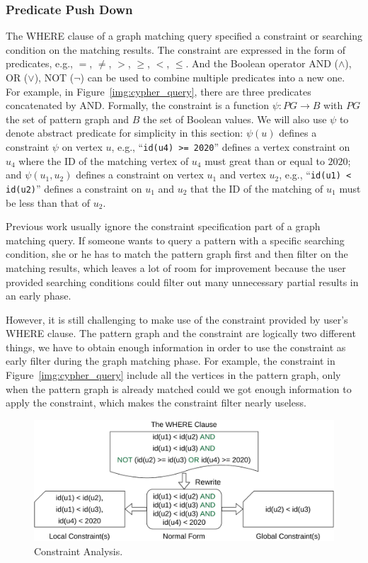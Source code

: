 \subsubsection{Predicate Push Down}
The WHERE clause of a graph matching query specified a constraint or searching condition on the matching results.
The constraint are expressed in the form of predicates, e.g., $=$, $\neq$, $>$, $\ge$, $<$, $\le$.
And the Boolean operator AND ($\land$), OR ($\lor$), NOT ($\lnot$) can be used to combine multiple predicates into a new one.
For example, in Figure~\ref{img:cypher_query}, there are three predicates concatenated by AND\@.
Formally, the constraint is a function $\psi: PG \rightarrow B$ with $PG$ the set of pattern graph and $B$ the set of Boolean values.
We will also use $\psi$ to denote abstract predicate for simplicity in this section:
$\psi(u)$ defines a constraint $\psi$ on vertex $u$, e.g., ``\texttt{id(u4) >= 2020}'' defines a vertex constraint on $u_4$ where the ID of the matching vertex of $u_4$ must great than or equal to $2020$;
and $\psi(u_1, u_2)$ defines a constraint on vertex $u_1$ and vertex $u_2$,
e.g., ``\texttt{id(u1) < id(u2)}'' defines a constraint on $u_1$ and $u_2$ that the ID of the matching of $u_1$ must be less than that of $u_2$.

Previous work usually ignore the constraint specification part of a graph matching query.
If someone wants to query a pattern with a specific searching condition,
she or he has to match the pattern graph first and then filter on the matching results,
which leaves a lot of room for improvement because the user provided searching conditions could filter out many unnecessary
partial results in an early phase.

However, it is still challenging to make use of the constraint provided by user's WHERE clause.
The pattern graph and the constraint are logically two different things,
we have to obtain enough information in order to use the constraint as early filter during the graph matching phase.
For example, the constraint in Figure~\ref{img:cypher_query} include all the vertices in the pattern graph,
only when the pattern graph is already matched could we got enough information to apply the constraint,
which makes the constraint filter nearly useless.

\begin{figure}[ht]
  \centering
  \includegraphics[width=.45\textwidth]{img/constraints.pdf}
  \caption{Constraint Analysis.}\label{img:constraints}
\end{figure}

